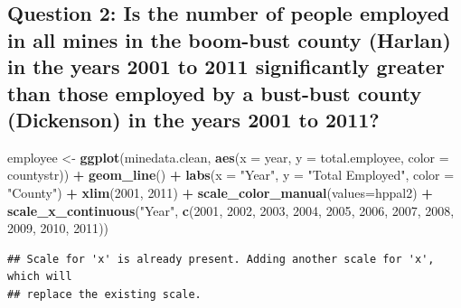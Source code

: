 \documentclass[12pt,]{article}
\newenvironment{Shaded}{\begin{snugshade}}{\end{snugshade}}
\newcommand{\DataTypeTok}[1]{\textcolor[rgb]{0.13,0.29,0.53}{#1}}
\newcommand{\DecValTok}[1]{\textcolor[rgb]{0.00,0.00,0.81}{#1}}
\newcommand{\KeywordTok}[1]{\textcolor[rgb]{0.13,0.29,0.53}{\textbf{#1}}}
\newcommand{\NormalTok}[1]{#1}
\newcommand{\OperatorTok}[1]{\textcolor[rgb]{0.81,0.36,0.00}{\textbf{#1}}}
\newcommand{\StringTok}[1]{\textcolor[rgb]{0.31,0.60,0.02}{#1}}
\begin{document}
\hypertarget{question-2-is-the-number-of-people-employed-in-all-mines-in-the-boom-bust-county-harlan-in-the-years-2001-to-2011-significantly-greater-than-those-employed-by-a-bust-bust-county-dickenson-in-the-years-2001-to-2011}{%
\subsection{Question 2: Is the number of people employed in all mines in
the boom-bust county (Harlan) in the years 2001 to 2011 significantly
greater than those employed by a bust-bust county (Dickenson) in the
years 2001 to
2011?}\label{question-2-is-the-number-of-people-employed-in-all-mines-in-the-boom-bust-county-harlan-in-the-years-2001-to-2011-significantly-greater-than-those-employed-by-a-bust-bust-county-dickenson-in-the-years-2001-to-2011}}

\begin{Shaded}
\begin{Highlighting}[]
\NormalTok{employee <-}\StringTok{ }\KeywordTok{ggplot}\NormalTok{(minedata.clean, }\KeywordTok{aes}\NormalTok{(}\DataTypeTok{x =}\NormalTok{ year, }\DataTypeTok{y =}\NormalTok{ total.employee, }\DataTypeTok{color =}\NormalTok{ countystr)) }\OperatorTok{+}
\StringTok{  }\KeywordTok{geom_line}\NormalTok{() }\OperatorTok{+}
\StringTok{  }\KeywordTok{labs}\NormalTok{(}\DataTypeTok{x =} \StringTok{"Year"}\NormalTok{, }\DataTypeTok{y =} \StringTok{"Total Employed"}\NormalTok{, }\DataTypeTok{color =} \StringTok{"County"}\NormalTok{) }\OperatorTok{+}
\StringTok{  }\KeywordTok{xlim}\NormalTok{(}\DecValTok{2001}\NormalTok{, }\DecValTok{2011}\NormalTok{) }\OperatorTok{+}
\StringTok{  }\KeywordTok{scale_color_manual}\NormalTok{(}\DataTypeTok{values=}\NormalTok{hppal2) }\OperatorTok{+}
\StringTok{  }\KeywordTok{scale_x_continuous}\NormalTok{(}\StringTok{"Year"}\NormalTok{, }\KeywordTok{c}\NormalTok{(}\DecValTok{2001}\NormalTok{, }\DecValTok{2002}\NormalTok{, }\DecValTok{2003}\NormalTok{, }\DecValTok{2004}\NormalTok{, }\DecValTok{2005}\NormalTok{, }\DecValTok{2006}\NormalTok{, }\DecValTok{2007}\NormalTok{, }\DecValTok{2008}\NormalTok{, }\DecValTok{2009}\NormalTok{, }\DecValTok{2010}\NormalTok{, }\DecValTok{2011}\NormalTok{))}
\end{Highlighting}
\end{Shaded}

\begin{verbatim}
## Scale for 'x' is already present. Adding another scale for 'x', which will
## replace the existing scale.
\end{verbatim}
\end{document}
